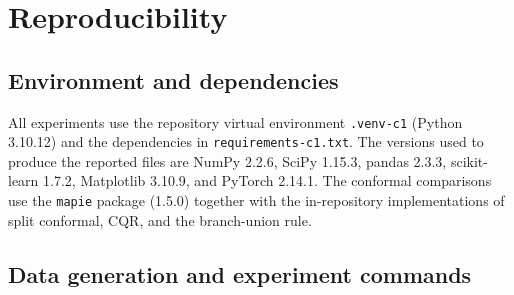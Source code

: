 %

\section{Reproducibility}\label{app:c}

\subsection{Environment and dependencies}\label{app:c1}

All experiments use the repository virtual environment
\texttt{.venv-c1} (Python 3.10.12) and the dependencies in
\texttt{requirements-c1.txt}. The versions used to produce the reported
files are NumPy 2.2.6, SciPy 1.15.3, pandas 2.3.3, scikit-learn 1.7.2,
Matplotlib 3.10.9, and PyTorch 2.14.1. The conformal comparisons use the
\texttt{mapie} package (1.5.0) together with the in-repository
implementations of split conformal, CQR, and the branch-union rule.

\subsection{Data generation and experiment commands}\label{app:c2}

